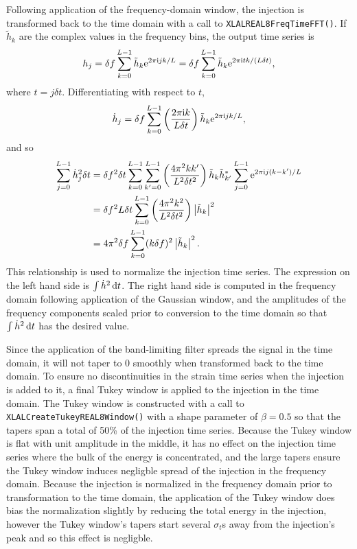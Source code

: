 \documentclass[10pt]{article}
\begin{document}
Following application of the frequency-domain window, the injection is
transformed back to the time domain with a call to
\texttt{XLALREAL8FreqTimeFFT()}.  If \(\tilde{h}_{k}\) are the complex
values in the frequency bins, the output time series is
\begin{equation}
h_{j}
   = \delta f \sum_{k = 0}^{L - 1} \tilde{h}_{k} \mathrm{e}^{2 \pi \mathrm{i} j k / L}
   = \delta f \sum_{k = 0}^{L - 1} \tilde{h}_{k} \mathrm{e}^{2 \pi \mathrm{i} t k / (L
   \delta t)},
\end{equation}
where \(t = j \delta t\).  Differentiating with respect to \(t\),
\begin{equation}
\dot{h}_{j}
   = \delta f \sum_{k = 0}^{L - 1} \left( \frac{2 \pi \mathrm{i} k}{L \delta t}
   \right) \tilde{h}_{k} \mathrm{e}^{2 \pi \mathrm{i} j k / L},
\end{equation}
and so
\begin{align}
\sum_{j = 0}^{L - 1} \dot{h}_{j}^{2} \delta t
   & = \delta f^{2} \delta t \sum_{k = 0}^{L - 1} \sum_{k' = 0}^{L - 1}
   \left( \frac{4 \pi^{2} k k'}{L^{2} \delta t^{2}} \right) \tilde{h}_{k}
   \tilde{h}_{k'}^{*} \sum_{j = 0}^{L - 1} \mathrm{e}^{2 \pi \mathrm{i} j (k - k') /
   L}
   \\
   & = \delta f^{2} L \delta t \sum_{k = 0}^{L - 1} \left( \frac{4 \pi^{2}
   k^{2}}{L^{2} \delta t^{2}} \right) \left|\tilde{h}_{k}\right|^{2}
   \\
   & = 4 \pi^{2} \delta f \sum_{k = 0}^{L - 1} (k \delta f)^{2}
   \left|\tilde{h}_{k}\right|^{2}.
\end{align}
This relationship is used to normalize the injection time series.  The
expression on the left hand side is \(\int \dot{h}^{2} \,\mathrm{d} t\).  The
right hand side is computed in the frequency domain following application
of the Gaussian window, and the amplitudes of the frequency components
scaled prior to conversion to the time domain so that \(\int \dot{h}^{2}
\,\mathrm{d} t\) has the desired value.

Since the application of the band-limiting filter spreads the signal in the
time domain, it will not taper to 0 smoothly when transformed back to the
time domain.  To ensure no discontinuities in the strain time series when
the injection is added to it, a final Tukey window is applied to the
injection in the time domain.  The Tukey window is constructed with a call
to \texttt{XLALCreateTukeyREAL8Window()} with a shape parameter of \(\beta
= 0.5\) so that the tapers span a total of 50\% of the injection time
series.  Because the Tukey window is flat with unit amplitude in the
middle, it has no effect on the injection time series where the bulk of the
energy is concentrated, and the large tapers ensure the Tukey window
induces negligble spread of the injection in the frequency domain.  Because
the injection is normalized in the frequency domain prior to transformation
to the time domain, the application of the Tukey window does bias the
normalization slightly by reducing the total energy in the injection,
however the Tukey window's tapers start several \(\sigma_{t}\)s away from
the injection's peak and so this effect is negligble.
\end{document}
